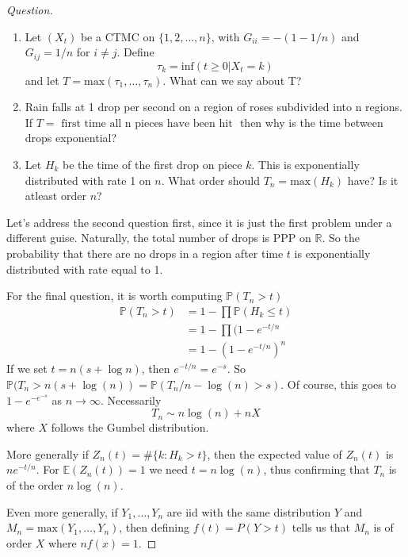 \documentclass{article}
\begin{document}
\begin{proof}[Question] 

	\begin{enumerate}
	\item Let $(X_t)$ be a CTMC on $\lbrace 1,2,\dots,n\rbrace$, with $G_{ii} = -(1-1/n)$ and $G_{ij} = 1/n$ for $i \neq j$. Define
	\[\tau_k = \text{inf}(t \geq 0 \vert X_t = k)\]
	and let $T = \text{max}(\tau_1,\dots,\tau_n)$. What can we say about T?
	\item Rain falls at 1 drop per second on a region of roses subdivided into n regions. If $T = \text{ first time all n pieces have been hit }$ then why is the time between drops exponential?
	\item Let $H_k$ be the time of the first drop on piece $k$. This is exponentially distributed with rate 1 on $n$. What order should $T_n = \text{max}(H_k)$ have? Is it atleast order $n$?
	\end{enumerate}
	Let's address the second question first, since it is just the first problem under a different guise. Naturally, the total number of drops is PPP on $\mathbb{R}$. So the probability that there are no drops in a region after time $t$ is exponentially distributed with rate equal to 1. 
	
	For the final question, it is worth computing $\mathbb{P}(T_n > t)$
	\begin{align*}
		\mathbb{P}(T_n > t) &= 1 - \prod \mathbb{P}(H_k \leq t)\\
		&= 1 - \prod (1 - e^{-t/n}\\
		&= 1 - (1 - e^{-t/n})^n
	\end{align*}
	If we set $t = n(s+\log n)$, then $e^{-t/n} = e^{-s}$. So 
	$\mathbb{P}(T_n > n(s+\log(n)) = \mathbb{P}(T_n / n - \log(n) > s)$. Of course, this goes to $1-e^{-e^{-s}}$ as $n \rightarrow \infty$. Necessarily
	\[T_n \sim n\log(n) + nX\]
	where $X$ follows the Gumbel distribution. 
	
	More generally if $Z_n(t) = \#\lbrace k : H_k > t\rbrace$, then the expected value of $Z_n(t)$ is $ne^{-t/n}$. For $\mathbb{E}(Z_n(t)) = 1$ we need $t = n\log(n)$, thus confirming that $T_n$ is of the order $n\log(n)$.
	
	Even more generally, if $Y_1,\dots, Y_n$ are iid with the same distribution $Y$ and $M_n = \text{max}(Y_1,\dots,Y_n)$, then defining $f(t) = P(Y > t)$ tells us that $M_n$ is of order $X$ where $nf(x) = 1$.  
\end{proof}
	
	
\end{document}
